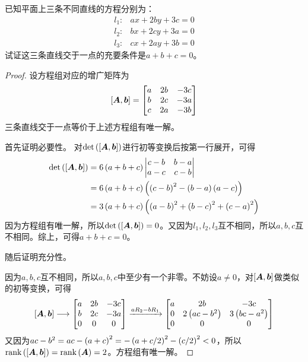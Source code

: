 \begin{problem}\label{problem-2.7}
已知平面上三条不同直线的方程分别为：
\begin{align*}
    l_1: & ax+2by+3c=0 \\
    l_2: & bx+2cy+3a=0 \\
    l_3: & cx+2ay+3b=0
\end{align*}
试证这三条直线交于一点的充要条件是\(a+b+c=0\)。
\end{problem}
\begin{proof}
    设方程组对应的增广矩阵为
    \begin{equation*}
        \left[ \boldsymbol{A},\boldsymbol{b} \right]=
        \begin{bmatrix}
            a & 2b & -3c \\
            b & 2c & -3a \\
            c & 2a & -3b
        \end{bmatrix}
    \end{equation*}
    三条直线交于一点等价于上述方程组有唯一解。

    首先证明必要性。
    对\(\mathrm{det}\left( \left[ \boldsymbol{A},\boldsymbol{b} \right] \right)\)进行初等变换后按第一行展开，可得
    \begin{align*}
        \mathrm{det}\left( \left[ \boldsymbol{A},\boldsymbol{b} \right] \right)
         & =6\left( a+b+c \right)\begin{vmatrix}c-b & b-a\\a-c & c-b\end{vmatrix} \\
         & =6\left( a+b+c \right)\left( \left( c-b \right)^2-\left( b-a \right)\left( a-c \right) \right)         \\
         & =3\left( a+b+c \right)\left( \left( a-b \right)^2+\left( b-c \right)^2+\left( c-a \right)^2 \right)
    \end{align*}
    因为方程组有唯一解，所以\(\mathrm{det}\left( \left[ \boldsymbol{A},\boldsymbol{b} \right] \right)=0\)。又因为\(l_1,l_2,l_3\)互不相同，所以\(a,b,c\)互不相同。综上，可得\(a+b+c=0\)。

    随后证明充分性。

    因为\(a,b,c\)互不相同，所以\(a,b,c\)中至少有一个非零。不妨设\(a\neq0\)，对\(\left[ \boldsymbol{A},\boldsymbol{b} \right]\)做类似的初等变换，可得
    \begin{equation*}
        \left[ \boldsymbol{A},\boldsymbol{b} \right]\longrightarrow
        \begin{bmatrix}
            a & 2b & -3c \\
            b & 2c & -3a \\
            0 & 0  & 0
        \end{bmatrix}\xrightarrow{aR_2-bR_1}
        \begin{bmatrix}
            a & 2b             & -3c            \\
            0 & 2\left( ac-b^2 \right) & 3\left( bc-a^2 \right) \\
            0 & 0              & 0
        \end{bmatrix}
    \end{equation*}
    又因为\(ac-b^2=ac-\left( a+c \right)^2=-\left( a+c/2 \right)^2-\left( c/2 \right)^2<0\)，所以\(\mathrm{rank}\left( \left[ \boldsymbol{A},\boldsymbol{b} \right] \right)=\mathrm{rank}\left( \boldsymbol{A} \right)=2\)。方程组有唯一解。
\end{proof}

